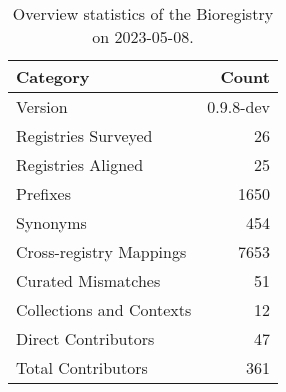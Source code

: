 \begin{table}
\caption{Overview statistics of the Bioregistry on 2023-05-08.}
\label{tab:bioregistry-summary}
\begin{tabular}{lr}
\toprule
Category & Count \\
\midrule
Version & 0.9.8-dev \\
Registries Surveyed & 26 \\
Registries Aligned & 25 \\
Prefixes & 1650 \\
Synonyms & 454 \\
Cross-registry Mappings & 7653 \\
Curated Mismatches & 51 \\
Collections and Contexts & 12 \\
Direct Contributors & 47 \\
Total Contributors & 361 \\
\bottomrule
\end{tabular}
\end{table}
